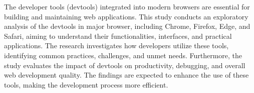 
\begin{abstractutfpr}%

The developer tools (devtools) integrated into modern browsers are essential for building and maintaining web applications. This study conducts an exploratory analysis of the devtools in major browser, including Chrome, Firefox, Edge, and Safari, aiming to understand their functionalities, interfaces, and practical applications. The research investigates how developers utilize these tools, identifying common practices, challenges, and unmet needs. Furthermore, the study evaluates the impact of devtools on productivity, debugging, and overall web development quality. The findings are expected to enhance the use of these tools, making the development process more efficient. \\

\end{abstractutfpr}
